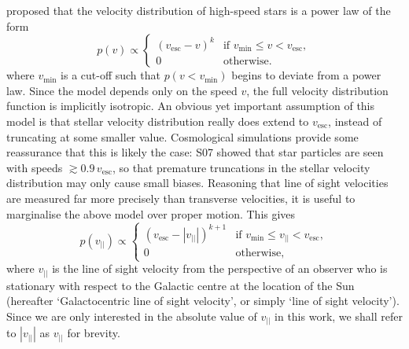 \documentclass[useAMS,twocolumn,usenatbib]{mn2e}
\def\vlos{{v_{||}}}
\def\vesc{{v_\mathrm{esc}}}
\def\vmin{{v_\mathrm{min}}}
\begin{document}
\cite{Le90} proposed that the velocity distribution of high-speed stars is a power law of the form
%
\begin{equation}
  p(v)\propto\begin{cases}
    (\vesc - v)^k & \text{if $\vmin \leq v<\vesc$},\\
    0 & \text{otherwise}.
  \end{cases}
  \label{eq:lt90}
\end{equation}
%
where $\vmin$ is a cut-off such that $p(v < \vmin)$ begins to deviate from a power law. 
Since the model depends only on the speed $v$, the full velocity distribution function is implicitly isotropic. 
An obvious yet important assumption of this model is that stellar velocity distribution really does extend to $\vesc$, instead of truncating at some smaller value.
Cosmological simulations provide some reassurance that this is likely the case: S07 showed that star particles are seen with speeds $\gtrsim 0.9\,\vesc$, so that premature truncations in the stellar velocity distribution may only cause small biases.  
Reasoning that line of sight velocities are measured far more precisely than transverse velocities, it is useful to marginalise the above model over proper motion.
This gives
%
\begin{equation}
  p(\vlos)\propto\begin{cases}
    (\vesc - |\vlos|)^{k+1} & \text{if $\vmin \leq \vlos <\vesc$},\\
    0 & \text{otherwise},
  \end{cases}
\end{equation}
%
where $\vlos$ is the line of sight velocity from the perspective of an observer who is stationary with respect to the Galactic centre at the location of the Sun (hereafter `Galactocentric line of sight velocity', or simply `line of sight velocity'). 
Since we are only interested in the absolute value of $\vlos$ in this work, we shall refer to $|\vlos|$ as $\vlos$ for brevity.
\end{document}
